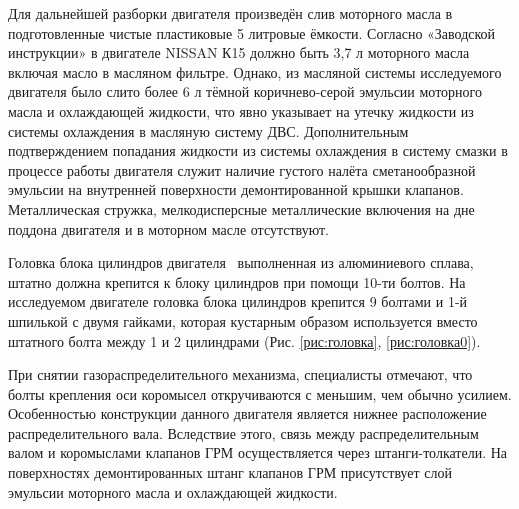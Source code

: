 Для дальнейшей разборки двигателя произведён слив моторного масла   в подготовленные чистые пластиковые 5 литровые ёмкости. Согласно «Заводской инструкции» в двигателе NISSAN К15 должно быть 3,7 л моторного масла включая масло в масляном фильтре.   Однако, из масляной системы исследуемого двигателя  было слито более 6 л тёмной коричнево-серой эмульсии моторного масла и охлаждающей жидкости, что явно указывает на  утечку жидкости из системы охлаждения в масляную систему ДВС.  Дополнительным подтверждением попадания жидкости из системы охлаждения в систему смазки в процессе работы двигателя служит наличие  густого налёта сметанообразной эмульсии на внутренней поверхности  демонтированной  крышки клапанов. Металлическая стружка, мелкодисперсные металлические включения на дне поддона двигателя и в моторном масле отсутствуют.

Головка блока цилиндров двигателя  \, выполненная из алюминиевого сплава, штатно должна крепится к блоку цилиндров  при помощи 10-ти болтов. На исследуемом двигателе головка блока цилиндров крепится 9 болтами  и 1-й  шпилькой с двумя гайками, которая кустарным образом используется вместо штатного  болта между  1 и 2 цилиндрами (Рис. \ref{рис:головка}, \ref{рис:головка0}).

При снятии   газораспределительного механизма, специалисты отмечают, что болты крепления оси  коромысел откручиваются с меньшим, чем обычно усилием. Особенностью конструкции данного двигателя является нижнее расположение распределительного вала. Вследствие этого, связь между распределительным валом и коромыслами клапанов ГРМ осуществляется через штанги-толкатели. На поверхностях демонтированных штанг клапанов ГРМ присутствует слой эмульсии моторного масла и охлаждающей жидкости.  

